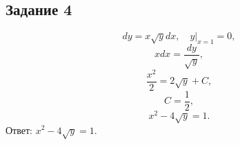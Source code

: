 \documentclass[11pt, a4paper]{article}
\begin{document}
	
	\subsection*{Задание 4}
	\par
	\begin{equation*}
    	dy = x\sqrt{y} dx,\quad y|_{x=1} = 0,
	\end{equation*}
	\begin{equation*}
    	xdx = \frac{dy}{\sqrt{y}},
	\end{equation*}
	\begin{equation*}
    	\frac{x^2}{2} = 2\sqrt{y} + C,
	\end{equation*}
	\begin{equation*}
   		C = \frac{1}{2},
	\end{equation*}
	\begin{equation*}
    	x^2 - 4\sqrt{y} = 1.
	\end{equation*}
	Ответ: $x^2 - 4\sqrt{y} = 1$.
\end{document}
